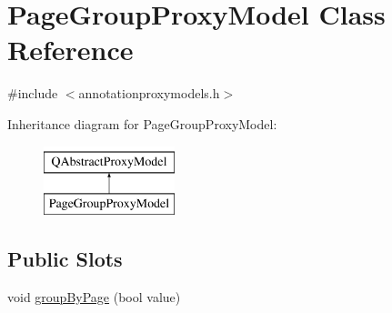 \hypertarget{classPageGroupProxyModel}{\section{Page\+Group\+Proxy\+Model Class Reference}
\label{classPageGroupProxyModel}
}


{\ttfamily \#include $<$annotationproxymodels.\+h$>$}

Inheritance diagram for Page\+Group\+Proxy\+Model\+:\begin{figure}[H]
\begin{center}
\leavevmode
\includegraphics[height=2.000000cm]{classPageGroupProxyModel}
\end{center}
\end{figure}
\subsection*{Public Slots}
\begin{DoxyCompactItemize}
\item 
void \hyperlink{classPageGroupProxyModel_add8e095d3e6ff7517b2ae96aebc636c4}{group\+By\+Page} (bool value)
\end{DoxyCompactItemize}
